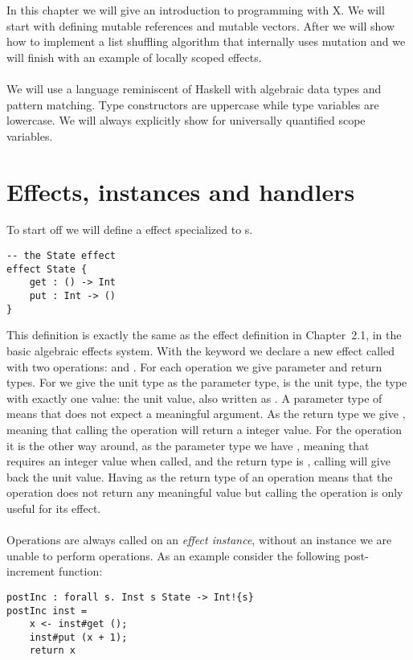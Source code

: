 \iffalse
\fi

In this chapter we will give an introduction to programming with X. We will start with defining mutable references and mutable vectors. After we will show how to implement a list shuffling algorithm that internally uses mutation and we will finish with an example of locally scoped effects.
\\\\
We will use a language reminiscent of Haskell with algebraic data types and pattern matching.
Type constructors are uppercase while type variables are lowercase.
We will always explicitly show  for universally quantified scope variables.

\section{Effects, instances and handlers}
To start off we will define a  effect specialized to s.
\begin{verbatim}
-- the State effect
effect State {
	get : () -> Int
	put : Int -> ()
}
\end{verbatim}

This definition is exactly the same as the  effect definition in Chapter~2.1, in the basic algebraic effects system.
With the  keyword we declare a new effect called  with two operations:  and .
For each operation we give parameter and return types. For  we give the unit type \ident{()} as the parameter type, \ident{()} is the unit type, the type with exactly one value: the unit value, also written as \ident{()}. A parameter type of \ident{()} means that  does not expect a meaningful argument. As the return type we give , meaning that calling the  operation will return a integer value. For the  operation it is the other way around, as the parameter type we have , meaning that  requires an integer value when called, and the return type is \ident{()}, calling  will give back the unit value. Having \ident{()} as the return type of an operation means that the operation does not return any meaningful value but calling the operation is only useful for its effect.
\\\\
Operations are always called on an \emph{effect instance}, without an instance we are unable to perform operations.
As an example consider the following post-increment function:
\begin{verbatim}
postInc : forall s. Inst s State -> Int!{s}
postInc inst =
	x <- inst#get ();
	inst#put (x + 1);
	return x
\end{verbatim}

